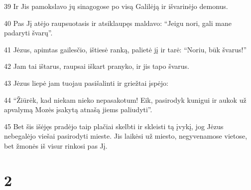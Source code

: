 \par 39 Ir Jis pamokslavo jų sinagogose po visą Galilėją ir išvarinėjo demonus. 
\par 40 Pas Jį atėjo raupsuotasis ir atsiklaupęs maldavo: “Jeigu nori, gali mane padaryti švarų”. 
\par 41 Jėzus, apimtas gailesčio, ištiesė ranką, palietė jį ir tarė: “Noriu, būk švarus!” 
\par 42 Jam tai ištarus, raupsai iškart pranyko, ir jis tapo švarus. 
\par 43 Jėzus liepė jam tuojau pasišalinti ir griežtai įspėjo: 
\par 44 “Žiūrėk, kad niekam nieko nepasakotum! Eik, pasirodyk kunigui ir aukok už apvalymą Mozės įsakytą atnašą jiems paliudyti”. 
\par 45 Bet šis išėjęs pradėjo taip plačiai skelbti ir skleisti tą įvykį, jog Jėzus nebegalėjo viešai pasirodyti mieste. Jis laikėsi už miesto, negyvenamose vietose, bet žmonės iš visur rinkosi pas Jį.


\chapter{2}



